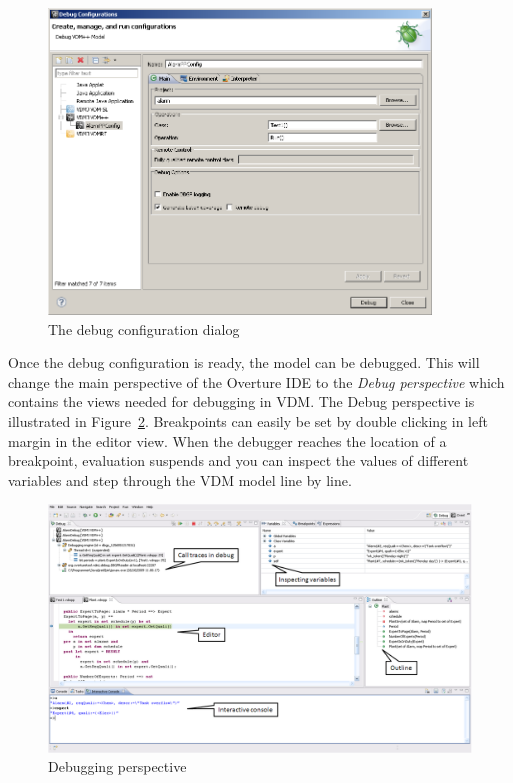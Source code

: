 \begin{figure}[htp]
\begin{center}
  \includegraphics[width=4in]{figures/DebugConfiguration}
  \caption{The debug configuration dialog}
  \label{fig:debugConfiguration}
\end{center}
\end{figure}

Once the debug configuration is ready, the model can be debugged. This
will change the main perspective of the Overture IDE to the
\emph{Debug perspective} which contains the views needed for debugging
in VDM. The Debug perspective is illustrated in Figure~\ref{fig:DebuggingVDM}. 
Breakpoints can easily be set by double clicking in left
margin in the editor view. When the debugger reaches the location of a
breakpoint, evaluation suspends and you can inspect the values of
different variables and step through the VDM model line by line.
 

\begin{figure}[htp]
\begin{center}
  \includegraphics[width=5in]{figures/DebuggingVDM}
  \caption[Debugging perspective]{Debugging perspective}
  \label{fig:DebuggingVDM}
\end{center}
\end{figure}

